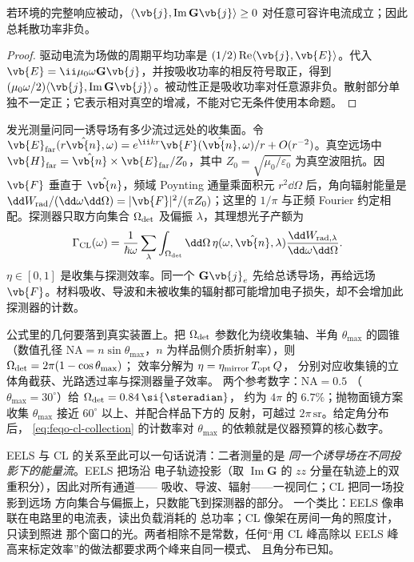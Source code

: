 \begin{proposition}[被动环境中的正性]
若环境的完整响应被动，\(\langle\vb{j},\operatorname{Im}\mathbf G\vb{j}\rangle\geq0\) 对任意可容许电流成立；因此总耗散功率非负。
\end{proposition}
\begin{proof}
驱动电流为场做的周期平均功率是 \((1/2)\operatorname{Re}\langle\vb{j},\vb{E}\rangle\)。代入 \(\vb{E}=\ii\mu_0\omega\mathbf G\vb{j}\)，并按吸收功率的相反符号取正，得到 \((\mu_0\omega/2)\langle\vb{j},\operatorname{Im}\mathbf G\vb{j}\rangle\)。被动性正是吸收功率对任意源非负。散射部分单独不一定正；它表示相对真空的增减，不能对它无条件使用本命题。
\end{proof}

发光测量问同一诱导场有多少流过远处的收集面。令 \(\vb{E}_{\rm far}(r\hat{\vb{n}},\omega)=e^{\ii kr}\vb{F}(\hat{\vb{n}},\omega)/r+O(r^{-2})\)。真空远场中 \(\vb{H}_{\rm far}=\hat{\vb{n}}\times\vb{E}_{\rm far}/Z_0\)，其中 \(Z_0=\sqrt{\mu_0/\varepsilon_0}\) 为真空波阻抗。因 \(\vb{F}\) 垂直于 \(\hat{\vb{n}}\)，频域 Poynting 通量乘面积元 \(r^2\dd\Omega\) 后，角向辐射能量是 \(\dd W_{\rm rad}/(\dd\omega\dd\Omega)=|\vb{F}|^2/(\pi Z_0)\)；这里的 \(1/\pi\) 与正频 Fourier 约定相配。探测器只取方向集合 \(\Omega_{\rm det}\) 及偏振 \(\lambda\)，其理想光子产额为
\begin{equation}
\Gamma_{\rm CL}(\omega)=\frac1{\hbar\omega}
\sum_\lambda\int_{\Omega_{\rm det}}\dd\Omega\,
\eta(\omega,\hat{\vb{n}},\lambda)
\frac{\dd W_{{\rm rad},\lambda}}{\dd\omega\dd\Omega}.
\label{eq:feqo-cl-collection}
\end{equation}
\(\eta\in[0,1]\) 是收集与探测效率。同一个 \(\mathbf G\vb{j}_e\) 先给总诱导场，再给远场 \(\vb{F}\)。材料吸收、导波和未被收集的辐射都可能增加电子损失，却不会增加此探测器的计数。

公式里的几何要落到真实装置上。把 \(\Omega_{\rm det}\)
参数化为绕收集轴、半角 \(\theta_{\max}\) 的圆锥
（数值孔径 \(\mathrm{NA}=n\sin\theta_{\max}\)，\(n\)
为样品侧介质折射率），则
\(\Omega_{\rm det}=2\pi(1-\cos\theta_{\max})\)；
效率分解为 \(\eta=\eta_{\rm mirror}\,T_{\rm opt}\,Q\)，
分别对应收集镜的立体角截获、光路透过率与探测器量子效率。
两个参考数字：\(\mathrm{NA}=0.5\)
（\(\theta_{\max}=30^\circ\)）给
\(\Omega_{\rm det}=0.84\,\si{\steradian}\)，
约为 \(4\pi\) 的 \(6.7\%\)；抛物面镜方案收集
\(\theta_{\max}\) 接近 \(60^\circ\) 以上、并配合样品下方的
反射，可越过 \(2\pi\,\si{\steradian}\)。给定角分布后，
\cref{eq:feqo-cl-collection} 的计数率对
\(\theta_{\max}\) 的依赖就是仪器预算的核心数字。

EELS 与 CL 的关系至此可以一句话说清：二者测量的是
\emph{同一个诱导场在不同投影下的能量流}。EELS 把场沿
电子轨迹投影（取 \(\operatorname{Im}\mathbf G\) 的
\(zz\) 分量在轨迹上的双重积分），因此对所有通道——
吸收、导波、辐射——一视同仁；CL 把同一场投影到远场
方向集合与偏振上，只数能飞到探测器的部分。
一个类比：EELS 像串联在电路里的电流表，读出负载消耗的
总功率；CL 像架在房间一角的照度计，只读到照进
那个窗口的光。两者相除不是常数，任何“用 CL 峰高除以
EELS 峰高来标定效率”的做法都要求两个峰来自同一模式、
且角分布已知。

